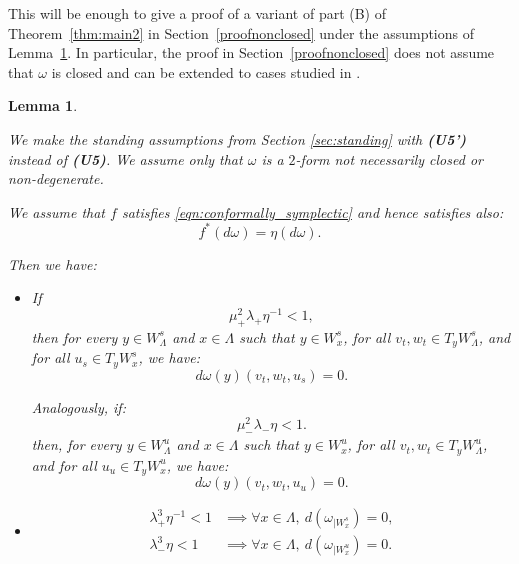 \documentclass[11pt]{amsart}
\newtheorem{lem}[thm]{Lemma}
\theoremstyle{definition}
\theoremstyle{remark}
\numberwithin{equation}{section}
\begin{document}
This will be enough to give a proof of a variant of part (B) of Theorem~\ref{thm:main2} in  Section~\ref{proofnonclosed} under the assumptions of Lemma~\ref{derivative_vanish}.
In particular, the proof in Section~\ref{proofnonclosed}  does not assume that $\omega$ is closed and can be
extended to cases studied in \cite{wojtkowski1998conformally}.


\begin{lem} \label{derivative_vanish}

We make the standing assumptions from Section \ref{sec:standing} with {\textbf{(U5')}} instead of {\textbf{(U5)}}.
We assume only  that $\omega$ is a $2$-form not necessarily closed or non-degenerate.

We assume that $f$ satisfies \eqref{eqn:conformally_symplectic} and  hence
satisfies also:
\begin{equation}\label{conformalderivative}
f^* (d\omega)  = \eta (d \omega).
\end{equation}


Then we have:
\begin{itemize}
\item[(A)]
If
  \begin{equation} \label{tts_rates}
    \mu_+^2 \lambda_+ \eta^{-1}  < 1,
    \end{equation}
  then  for every $y \in W^s_\Lambda$ and $x\in\Lambda $ such that $y\in W^s_x$,
  for all
  $v_t, w_t \in  T_y W^s_\Lambda$, and for all $u_s \in T_y  W^s_x$,
  we have:
  \begin{equation} \label{vanish_matrix_tts}
    d\omega (y) (v_t, w_t, u_s) = 0.
  \end{equation}

  Analogously, if:
  \begin{equation} \label{ttu_rates}
    \mu_-^2 \lambda_- \eta  < 1.
  \end{equation}
    then,   for every $y \in W^u_\Lambda$ and $x\in\Lambda $ such that $y\in W^u_x$,
  for all
  $v_t, w_t \in  T_y W^u_\Lambda$, and for all $u_u \in T_y  W^u_x$,
  we have:
  \begin{equation} \label{vanish_matrix_ttu}
    d\omega (y)(v_t, w_t, u_u) = 0.
  \end{equation}
\item[(B)]
  \begin{equation}
\begin{split}
\lambda_+^3 \eta^{-1} < 1 & \implies  \forall x \in \Lambda, \
d(\omega_{\mid W^s_x})= 0, \\
\lambda_-^3 \eta < 1 & \implies \forall x \in \Lambda, \
d(\omega_{\mid W^u_x})= 0.
\end{split}
\end{equation}
\end{itemize}
\end{lem}
\end{document}
